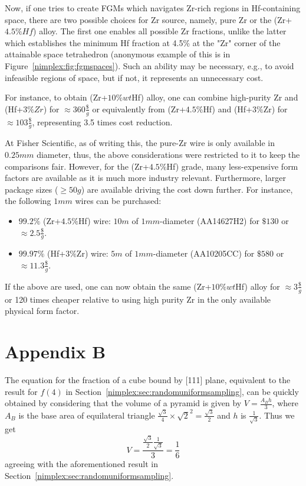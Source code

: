 Now, if one tries to create FGMs which navigates Zr-rich regions in Hf-containing space, there are two possible choices for Zr source, namely, pure Zr or the (Zr+$4.5\%Hf$) alloy. The first one enables all possible Zr fractions, unlike the latter which establishes the minimum Hf fraction at 4.5\% at the "Zr" corner of the attainable space tetrahedron (anonymous example of this is in Figure~\ref{nimplex:fig:fgmspaces}). Such an ability may be necessary, e.g., to avoid infeasible regions of space, but if not, it represents an unnecessary cost. 

For instance, to obtain (Zr+$10\%wt$Hf) alloy, one can combine high-purity Zr and (Hf+$3\%Zr$) for $\approx 360\frac{\$}{g}$ or equivalently from (Zr+$4.5\%$Hf) and (Hf+$3\%$Zr) for $\approx 103\frac{\$}{g}$, representing 3.5 times cost reduction.

At Fisher Scientific, as of writing this, the pure-Zr wire is only available in $0.25mm$ diameter, thus, the above considerations were restricted to it to keep the comparisons fair. However, for the (Zr+$4.5\%$Hf) grade, many less-expensive form factors are available as it is much more industry relevant. Furthermore, larger package sizes ($\geq50g$) are available driving the cost down further. For instance, the following $1mm$ wires can be purchased:

\begin{itemize}
    \item $99.2\%$ (Zr+$4.5\%$Hf) wire: $10m$ of $1mm$-diameter  (AA14627H2) for $\$130$ or $\approx 2.5\frac{\$}{g}$. 
    \item $99.97\%$ (Hf+$3\%$Zr) wire: $5m$ of $1mm$-diameter (AA10205CC) for $\$580$ or $\approx 11.3\frac{\$}{g}$. 
\end{itemize}

If the above are used, one can now obtain the same (Zr+$10\%wt$Hf) alloy for $\approx 3\frac{\$}{g}$ or 120 times cheaper relative to using high purity Zr in the only available physical form factor.
    

\section*{Appendix B}  \label{nimplex:app2}

The equation for the fraction of a cube bound by [111] plane, equivalent to the result for $f(4)$ in Section~\ref{nimplex:sec:randomuniformsampling}, can be quickly obtained by considering that the volume of a pyramid is given by $V = \frac{A_B h}{3}$, where $A_B$ is the base area of equilateral triangle $\frac{\sqrt{3}}{4}\times\sqrt{2}^2 = \frac{\sqrt{3}}{2}$ and $h$ is $\frac{1}{\sqrt{3}}$. Thus we get 
$$V = \frac{\frac{\sqrt{3}}{2} \frac{1}{\sqrt{3}}}{3} = \frac{1}{6}$$ 
agreeing with the aforementioned result in Section~\ref{nimplex:sec:randomuniformsampling}.

